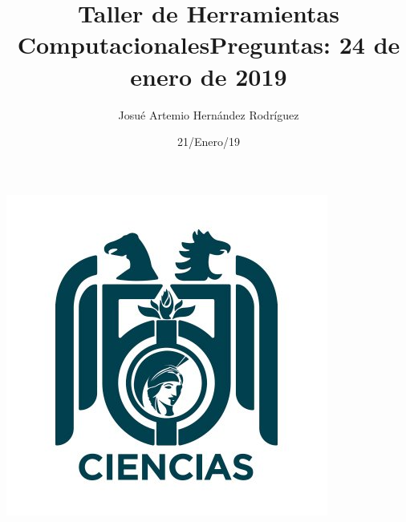 \documentclass[letterpaper, 12pt, oneside]{article}%
\title{\Huge Taller de Herramientas Computacionales}
\author{Josué Artemio Hernández Rodríguez}%
\date{21/Enero/19}%
\begin{document}
\maketitle
\begin{center}%
\includegraphics[scale=.6]{3.jpg}%
\end{center}%
\newpage%

\title{\huge Preguntas: 24 de enero de 2019\\}%
\end{document}
